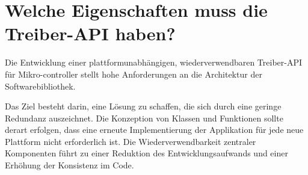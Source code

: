 \section{Welche Eigenschaften muss die Treiber-API haben?}

Die Entwicklung einer plattformunabhängigen, wiederverwendbaren Treiber-API für Mikro-controller stellt hohe Anforderungen an die Architektur der Softwarebibliothek.

Das Ziel besteht darin, eine Lösung zu schaffen, die sich durch eine geringe Redundanz auszeichnet. 
Die Konzeption von Klassen und Funktionen sollte derart erfolgen, dass eine erneute Implementierung der Applikation für jede neue Plattform nicht erforderlich ist.
Die Wiederverwendbarkeit zentraler Komponenten führt zu einer Reduktion des Entwicklungsaufwands und einer Erhöhung der Konsistenz im Code.

